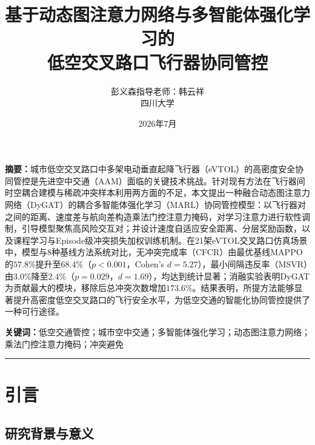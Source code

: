 \documentclass[12pt,a4paper,UTF8]{ctexart}
\begin{document}
\title{\textbf{基于动态图注意力网络与多智能体强化学习的\\低空交叉路口飞行器协同管控}}
\author{彭义森\quad 指导老师：韩云祥\\[4pt]\small 四川大学}
\date{2026年7月}

\maketitle

\vspace{6pt}
\noindent\textbf{摘\quad 要：}城市低空交叉路口中多架电动垂直起降飞行器（eVTOL）的高密度安全协同管控是先进空中交通（AAM）面临的关键技术挑战。针对现有方法在飞行器间时空耦合建模与稀疏冲突样本利用两方面的不足，本文提出一种融合动态图注意力网络（DyGAT）的耦合多智能体强化学习（MARL）协同管控模型：以飞行器对之间的距离、速度差与航向差构造乘法门控注意力掩码，对学习注意力进行软性调制，引导模型聚焦高风险交互对；并设计速度自适应安全距离、分层奖励函数，以及课程学习与Episode级冲突损失加权训练机制。在21架eVTOL交叉路口仿真场景中，模型与8种基线方法系统对比，无冲突完成率（CFCR）由最优基线MAPPO的$57.8\%$提升至$68.4\%$（$p<0.001$，Cohen's $d=5.27$），最小间隔违反率（MSVR）由$3.0\%$降至$2.4\%$（$p=0.029$，$d=1.69$），均达到统计显著；消融实验表明DyGAT为贡献最大的模块，移除后总冲突次数增加$173.6\%$。结果表明，所提方法能够显著提升高密度低空交叉路口的飞行安全水平，为低空交通的智能化协同管控提供了一种可行途径。

\vspace{6pt}
\noindent\textbf{关键词：}低空交通管控；城市空中交通；多智能体强化学习；动态图注意力网络；乘法门控注意力掩码；冲突避免

\vspace{8pt}
\hrule
\vspace{10pt}

\section{引言}

\subsection{研究背景与意义}
\end{document}
